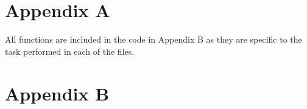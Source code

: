 \documentclass[10pt]{article}
\begin{document}



\onecolumn
\section{Appendix A}
\label{AppendixA}
All functions are included in the code in Appendix B as they are specific to the task performed in each of the files.

\section{Appendix B}

\end{document}
